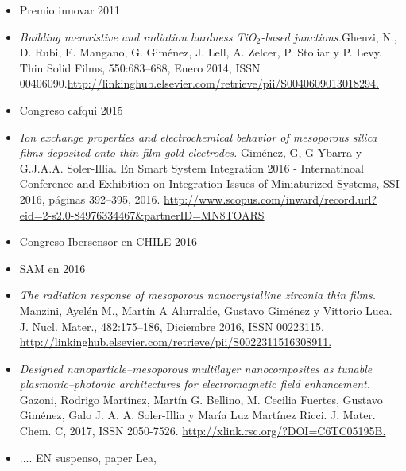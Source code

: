   \begin{itemize}
  	
  	\item Premio innovar 2011
   
    \item \textit{Building memristive and radiation hardness TiO$_2$-based junctions.}\linebreak Ghenzi, N., D. Rubi, E. Mangano, G. Giménez, J. Lell, A. Zelcer, P. Stoliar y P. Levy. Thin Solid Films, 550:683–688, Enero 2014, ISSN 00406090.\url{http://linkinghub.elsevier.com/retrieve/pii/S0040609013018294.}

    \item Congreso cafqui 2015
    
    \item \textit{Ion exchange properties and electrochemical behavior of mesoporous silica films deposited onto thin film gold electrodes.} Giménez, G, G Ybarra y G.J.A.A. Soler-Illia. En Smart System Integration 2016 - Internatinoal Conference and
    Exhibition on Integration Issues of Miniaturized Systems, SSI 2016, páginas 392–395, 2016. \url{http://www.scopus.com/inward/record.url?eid=2-s2.0-84976334467&partnerID=MN8TOARS}
    
    \item Congreso Ibersensor en CHILE 2016
    
    \item SAM en 2016

    \item  \textit{The radiation response of mesoporous nanocrystalline zirconia thin films.} Manzini, Ayelén M., Martín A Alurralde, Gustavo Giménez y Vittorio Luca. J. Nucl. Mater., 482:175–186, Diciembre 2016, ISSN 00223115. \url{http://linkinghub.elsevier.com/retrieve/pii/S0022311516308911.}

    \item \textit{Designed nanoparticle–mesoporous multilayer nanocomposites as tunable
    plasmonic–photonic architectures for electromagnetic field enhancement.}  Gazoni, Rodrigo Martínez, Martín G. Bellino, M. Cecilia Fuertes, Gustavo Giménez, Galo J. A. A. Soler-Illia y María Luz Martínez Ricci. J. Mater. Chem. C, 2017, ISSN 2050-7526. \url{http://xlink.rsc.org/?DOI=C6TC05195B.}
    
    \item .... EN suspenso, paper Lea, 

  \end{itemize}	

  \let\thispagestyle=\originalstyle